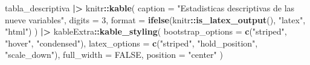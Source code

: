 \documentclass[
]{book}
\newenvironment{Shaded}{\begin{snugshade}}{\end{snugshade}}
\newcommand{\AttributeTok}[1]{\textcolor[rgb]{0.13,0.29,0.53}{#1}}
\newcommand{\ConstantTok}[1]{\textcolor[rgb]{0.56,0.35,0.01}{#1}}
\newcommand{\DecValTok}[1]{\textcolor[rgb]{0.00,0.00,0.81}{#1}}
\newcommand{\FunctionTok}[1]{\textcolor[rgb]{0.13,0.29,0.53}{\textbf{#1}}}
\newcommand{\NormalTok}[1]{#1}
\newcommand{\SpecialCharTok}[1]{\textcolor[rgb]{0.81,0.36,0.00}{\textbf{#1}}}
\newcommand{\StringTok}[1]{\textcolor[rgb]{0.31,0.60,0.02}{#1}}
\begin{document}
\begin{Shaded}
\begin{Highlighting}[]
\NormalTok{tabla\_descriptiva }\SpecialCharTok{|\textgreater{}}
\NormalTok{  knitr}\SpecialCharTok{::}\FunctionTok{kable}\NormalTok{(}
    \AttributeTok{caption =} \StringTok{"Estadisticas descriptivas de las nueve variables"}\NormalTok{,}
    \AttributeTok{digits =} \DecValTok{3}\NormalTok{,}
    \AttributeTok{format =} \FunctionTok{ifelse}\NormalTok{(knitr}\SpecialCharTok{::}\FunctionTok{is\_latex\_output}\NormalTok{(), }\StringTok{"latex"}\NormalTok{, }\StringTok{"html"}\NormalTok{)}
\NormalTok{  ) }\SpecialCharTok{|\textgreater{}}
\NormalTok{  kableExtra}\SpecialCharTok{::}\FunctionTok{kable\_styling}\NormalTok{(}
    \AttributeTok{bootstrap\_options =} \FunctionTok{c}\NormalTok{(}\StringTok{"striped"}\NormalTok{, }\StringTok{"hover"}\NormalTok{, }\StringTok{"condensed"}\NormalTok{),}
    \AttributeTok{latex\_options =} \FunctionTok{c}\NormalTok{(}\StringTok{"striped"}\NormalTok{, }\StringTok{"hold\_position"}\NormalTok{, }\StringTok{"scale\_down"}\NormalTok{),}
    \AttributeTok{full\_width =} \ConstantTok{FALSE}\NormalTok{,}
    \AttributeTok{position =} \StringTok{"center"}
\NormalTok{  )}
\end{Highlighting}
\end{Shaded}
\end{document}
